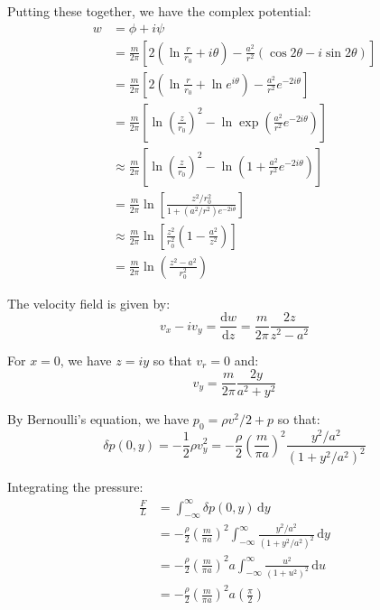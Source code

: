 \documentclass[12pt]{article}
\begin{document}
Putting these together, we have the complex potential:
\begin{equation}
    \begin{split}
        w &= \phi + i\psi \\
        &= \frac{m}{2\pi} \left[ 2 \left( \ln{\frac{r}{r_{0}}} + i\theta \right) - \frac{a^{2}}{r^{2}} \left( \cos{2\theta} - i\sin{2\theta} \right) \right] \\
        &= \frac{m}{2\pi} \left[ 2 \left( \ln{\frac{r}{r_{0}}} + \ln{e^{i\theta}} \right) - \frac{a^{2}}{r^{2}} e^{-2i\theta} \right] \\
        &= \frac{m}{2\pi} \left[ \ln{\left( \frac{z}{r_{0}} \right)^{2}} - \ln{\exp\left( \frac{a^{2}}{r^{2}} e^{-2i\theta} \right)} \right] \\
        &\approx \frac{m}{2\pi} \left[ \ln{\left( \frac{z}{r_{0}} \right)^{2}} - \ln{\left( 1 + \frac{a^{2}}{r^{2}} e^{-2i\theta} \right)} \right] \\
        &= \frac{m}{2\pi} \ln{\left[ \frac{z^{2}/r_{0}^{2}}{1 + (a^{2}/r^{2}) e^{-2i\theta}} \right]} \\
        &\approx \frac{m}{2\pi} \ln{\left[ \frac{z^{2}}{r_{0}^{2}} \left( 1 - \frac{a^{2}}{z^{2}} \right) \right]} \\
        &= \frac{m}{2\pi} \ln{\left( \frac{z^{2} - a^{2}}{r_{0}^{2}} \right)}
    \end{split}
\end{equation}

The velocity field is given by:
\begin{equation}
    v_{x} - iv_{y} = \frac{\mathrm{d}w}{\mathrm{d}z} = \frac{m}{2\pi} \frac{2z}{z^{2} - a^{2}}
\end{equation}

For $x = 0$, we have $z = iy$ so that $v_{r} = 0$ and:
\begin{equation}
    v_{y} = \frac{m}{2\pi} \frac{2y}{a^{2} + y^{2}}
\end{equation}

By Bernoulli's equation, we have $p_{0} = \rho v^{2}/2 + p$ so that:
\begin{equation}
    \delta p(0, y) = -\frac{1}{2} \rho v_{y}^{2} = -\frac{\rho}{2} \left( \frac{m}{\pi a} \right)^{2} \frac{y^{2}/a^{2}}{(1 + y^{2}/a^{2})^{2}}
\end{equation}

Integrating the pressure:
\begin{equation}
    \begin{split}
        \frac{F}{L} &= \int_{-\infty}^{\infty} \delta p(0, y) \, \mathrm{d}y \\
        &= -\frac{\rho}{2} \left( \frac{m}{\pi a} \right)^{2} \int_{-\infty}^{\infty} \frac{y^{2}/a^{2}}{(1 + y^{2}/a^{2})^{2}} \, \mathrm{d}y \\
        &= -\frac{\rho}{2} \left( \frac{m}{\pi a} \right)^{2} a \int_{-\infty}^{\infty} \frac{u^{2}}{(1 + u^{2})^{2}} \, \mathrm{d}u \\
        &= -\frac{\rho}{2} \left( \frac{m}{\pi a} \right)^{2} a \left( \frac{\pi}{2} \right)
    \end{split}
\end{equation}
\end{document}

